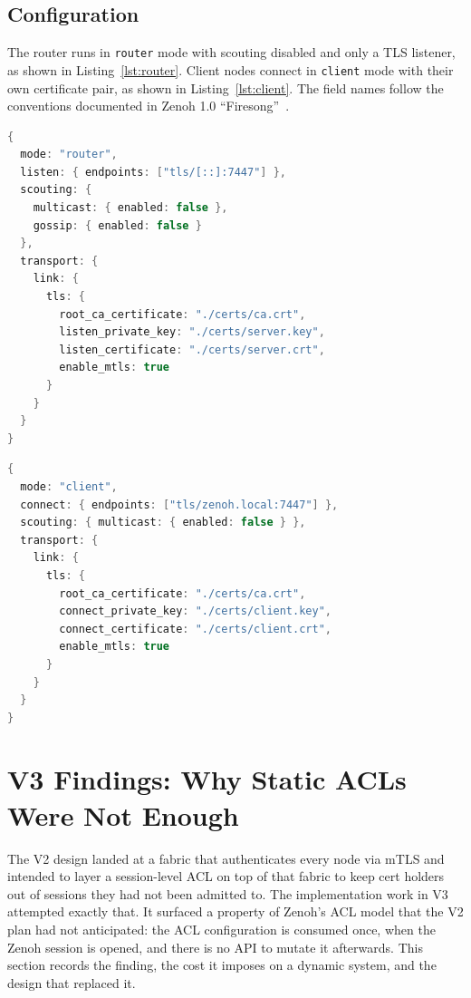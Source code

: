\documentclass[11pt,a4paper]{article}
\begin{document}
\subsection{Configuration}

The router runs in \texttt{router} mode with scouting disabled and
only a TLS listener, as shown in Listing~\ref{lst:router}. Client
nodes connect in \texttt{client} mode with their own certificate
pair, as shown in Listing~\ref{lst:client}. The field names follow
the conventions documented in Zenoh 1.0
``Firesong''~\citep{zenoh-firesong,zenoh-config}.

\begin{lstlisting}[language=Java,caption={Router configuration (JSON5).},label={lst:router}]
{
  mode: "router",
  listen: { endpoints: ["tls/[::]:7447"] },
  scouting: {
    multicast: { enabled: false },
    gossip: { enabled: false }
  },
  transport: {
    link: {
      tls: {
        root_ca_certificate: "./certs/ca.crt",
        listen_private_key: "./certs/server.key",
        listen_certificate: "./certs/server.crt",
        enable_mtls: true
      }
    }
  }
}
\end{lstlisting}

\begin{lstlisting}[language=Java,caption={Client configuration (JSON5).},label={lst:client}]
{
  mode: "client",
  connect: { endpoints: ["tls/zenoh.local:7447"] },
  scouting: { multicast: { enabled: false } },
  transport: {
    link: {
      tls: {
        root_ca_certificate: "./certs/ca.crt",
        connect_private_key: "./certs/client.key",
        connect_certificate: "./certs/client.crt",
        enable_mtls: true
      }
    }
  }
}
\end{lstlisting}

\section{V3 Findings: Why Static ACLs Were Not Enough}
\label{sec:v3-acls}

The V2 design landed at a fabric that authenticates every node via
mTLS and intended to layer a session-level ACL on top of that fabric
to keep cert holders out of sessions they had not been admitted to.
The implementation work in V3 attempted exactly that. It surfaced a
property of Zenoh's ACL model that the V2 plan had not anticipated:
the ACL configuration is consumed once, when the Zenoh session is
opened, and there is no API to mutate it afterwards. This section
records the finding, the cost it imposes on a dynamic system, and the
design that replaced it.
\end{document}
